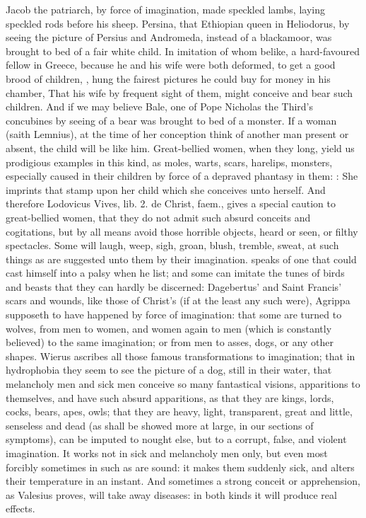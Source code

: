 {{Jacob the patriarch, by force of imagination, made speckled lambs,
laying speckled rods before his sheep. Persina, that Ethiopian queen in
Heliodorus, by seeing the picture of Persius and Andromeda, instead of
a blackamoor, was brought to bed of a fair white child. In imitation of
whom belike, a hard-favoured fellow in Greece, because he and his wife
were both deformed, to get a good brood of children, , \etc{} hung the fairest pictures he could
buy for money in his chamber, That his wife by frequent sight of them,
might conceive and bear such children. And if we may believe Bale, one
of Pope Nicholas the Third's concubines by seeing of a bear was
brought to bed of a monster. If a woman (saith  Lemnius), at the
time of her conception think of another man present or absent, the
child will be like him. Great-bellied women, when they long, yield us
prodigious examples in this kind, as moles, warts, scars, harelips,
monsters, especially caused in their children by force of a depraved
phantasy in them: :
She imprints that stamp upon her child which she conceives unto
herself. And therefore Lodovicus Vives, lib. 2. de Christ, faem., gives
a special caution to great-bellied women, that they do not admit
such absurd conceits and cogitations, but by all means avoid those
horrible objects, heard or seen, or filthy spectacles. Some will laugh,
weep, sigh, groan, blush, tremble, sweat, at such things as are
suggested unto them by their imagination. \Avicenna{} speaks of one that
could cast himself into a palsy when he list; and some can imitate the
tunes of birds and beasts that they can hardly be discerned:
Dagebertus' and Saint Francis' scars and wounds, like those of Christ's
(if at the least any such were), Agrippa supposeth to have
happened by force of imagination: that some are turned to wolves, from
men to women, and women again to men (which is constantly believed) to
the same imagination; or from men to asses, dogs, or any other shapes.
Wierus ascribes all those famous transformations to imagination;
that in hydrophobia they seem to see the picture of a dog, still in
their water, that melancholy men and sick men conceive so many
fantastical visions, apparitions to themselves, and have such absurd
apparitions, as that they are kings, lords, cocks, bears, apes, owls;
that they are heavy, light, transparent, great and little, senseless
and dead (as shall be showed more at large, in our  sections of
symptoms), can be imputed to nought else, but to a corrupt, false, and
violent imagination. It works not in sick and melancholy men only, but
even most forcibly sometimes in such as are sound: it makes them
suddenly sick, and alters their temperature in an instant. And
sometimes a strong conceit or apprehension, as Valesius proves,
will take away diseases: in both kinds it will produce real effects.

}}
